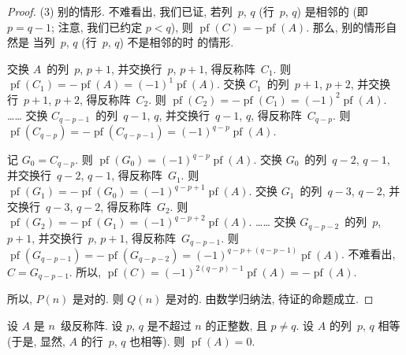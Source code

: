 \documentclass[../libro.tex]{subfiles}
\begin{document}
\begin{proof}
    (3)
    别的情形.
    不难看出, 我们已证,
    若列~\(p\), \(q\) (行~\(p\), \(q\)) 是相邻的
    (即 \(p = q - 1\);
    注意, 我们已约定 \(p < q\)),
    则 \(\operatorname{pf} {(C)}
    = -\operatorname{pf} {(A)}\).
    那么, 别的情形自然是%
    当列~\(p\), \(q\) (行~\(p\), \(q\)) 不是相邻的时%
    的情形.

    交换 \(A\)~的列~\(p\), \(p+1\),
    并交换行~\(p\), \(p+1\),
    得反称阵~\(C_1\).
    则 \(\operatorname{pf} {(C_1)} = -\operatorname{pf} {(A)}
    = (-1)^{1} \operatorname{pf} {(A)}\).
    交换 \(C_1\)~的列~\(p+1\), \(p+2\),
    并交换行~\(p+1\), \(p+2\),
    得反称阵~\(C_2\).
    则 \(\operatorname{pf} {(C_2)} = -\operatorname{pf} {(C_1)}
    = (-1)^{2} \operatorname{pf} {(A)}\).
    ……
    交换 \(C_{q-p-1}\)~的列~\(q-1\), \(q\),
    并交换行~\(q-1\), \(q\),
    得反称阵~\(C_{q-p}\).
    则 \(\operatorname{pf} {(C_{q-p})} = -\operatorname{pf} {(C_{q-p-1})}
    = (-1)^{q-p} \operatorname{pf} {(A)}\).

    记 \(G_0 = C_{q-p}\).
    则 \(\operatorname{pf} {(G_0)} = (-1)^{q-p} \operatorname{pf} {(A)}\).
    交换 \(G_0\)~的列~\(q-2\), \(q-1\),
    并交换行~\(q-2\), \(q-1\),
    得反称阵~\(G_1\).
    则 \(\operatorname{pf} {(G_1)} = -\operatorname{pf} {(G_0)}
    = (-1)^{q-p+1} \operatorname{pf} {(A)}\).
    交换 \(G_1\)~的列~\(q-3\), \(q-2\),
    并交换行~\(q-3\), \(q-2\),
    得反称阵~\(G_2\).
    则 \(\operatorname{pf} {(G_2)} = -\operatorname{pf} {(G_1)}
    = (-1)^{q-p+2} \operatorname{pf} {(A)}\).
    ……
    交换 \(G_{q-p-2}\)~的列~\(p\), \(p+1\),
    并交换行~\(p\), \(p+1\),
    得反称阵~\(G_{q-p-1}\).
    则 \(\operatorname{pf} {(G_{q-p-1})} = -\operatorname{pf} {(G_{q-p-2})}
    = (-1)^{q-p+(q-p-1)} \operatorname{pf} {(A)}\).
    不难看出, \(C = G_{q-p-1}\).
    所以,
    \(\operatorname{pf} {(C)}
        = (-1)^{2(q-p)-1} \operatorname{pf} {(A)}
    = -\operatorname{pf} {(A)}\).

    所以, \(P(n)\) 是对的.
    则 \(Q(n)\) 是对的.
    由数学归纳法, 待证的命题成立.

\end{proof}

\begin{theorem}
    设 \(A\) 是 \(n\)~级反称阵.
    设 \(p\), \(q\) 是不超过 \(n\) 的正整数, 且 \(p \neq q\).
    设 \(A\) 的列~\(p\), \(q\) 相等
    (于是, 显然, \(A\) 的行~\(p\), \(q\) 也相等).
    则 \(\operatorname{pf} {(A)} = 0\).
\end{theorem}
\end{document}

